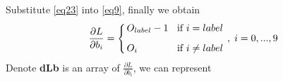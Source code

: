 \documentclass[a4paper,12pt]{article}
\newcommand*\myyellowbox[1]{%
\colorbox{myyellow}{\hspace{1em}#1\hspace{1em}}}
\begin{document}
Substitute \eqref{eq23} into \eqref{eq9}, finally we obtain
\begin{equation}
\arraycolsep=0.05cm\def\arraystretch{1.0}
\frac{\partial{L}}{\partial{b_i}} = \left\{
                                        \begin{array}{ll}
                                          O_{label} - 1 &\thickspace\text{ if } i = label\\[0.3cm]
                                          O_i &\thickspace\text{ if } i \neq label
                                        \end{array}
                                     \right. ,\thickspace i = 0, ..., 9 \label{eq25}
\end{equation}
Denote \textbf{dLb} is an array of $\frac{\partial{L}}{\partial{b_i}}$, we can represent
\end{document}
